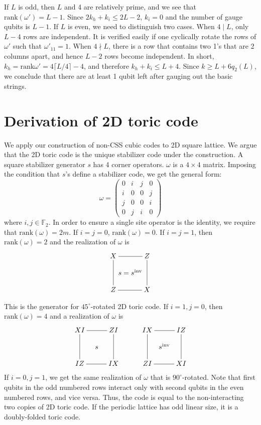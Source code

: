 \documentclass[letterpaper,10pt,pra,aps,showpacs,twocolumn]{revtex4-1}
\theoremstyle{definition} \newtheorem{defn}{Definition}
\theoremstyle{definition} \newtheorem{remark}{Remark}
\newcommand{\rank}{\mathrm{rank}}
\begin{document}
If $L$ is odd, then $L$ and 4 are relatively prime, and we see that $\rank(\omega') = L-1$. Since $2 k_h + k_i \leq 2L -2$, $k_i=0$ and the number of gauge qubits is $L-1$. If $L$ is even, we need to distinguish two cases. When $4 \mid L$, only $L-4$ rows are independent. It is verified easily if one cyclically rotate the rows of $\omega'$ such that $\omega'_{11}=1$. When $4 \nmid L$, there is a row that contains two 1's that are 2 columns apart, and hence $L-2$ rows become independent. In short, $k_h = \rank \omega' = 4 \lceil L/4 \rceil - 4$, and therefore $ k_h + k_i \leq L + 4$. Since $ k \geq L + 6 q_2(L) $, we conclude that there are at least 1 qubit left after gauging out the basic strings.


\section{Derivation of 2D toric code}

We apply our construction of non-CSS cubic codes to 2D square lattice. We argue that the 2D toric code is the unique stabilizer code under the construction. A square stabilizer generator $s$ has 4 corner operators. $\omega$ is a $4 \times 4$ matrix. Imposing the condition that $s$'s define a stabilizer code, we get the general form:
\begin{equation*}
 \omega = 
 \begin{pmatrix}
  0 & i & j & 0 \\
  i & 0 & 0 & j \\
  j & 0 & 0 & i \\
  0 & j & i & 0
 \end{pmatrix}
\end{equation*}
where $i,j \in \mathbb{F}_2$. In order to ensure a single site operator is the identity, we require that $\rank(\omega) = 2 m $. If $i=j=0$, $\rank(\omega)=0$. If $i=j=1$, then $\rank(\omega)=2$ and the realization of $\omega$ is
\[
 \xymatrix@!0{
  X\ar@{-}[rr]\ar@{-}[dd]&           & Z\ar@{-}[dd]\\
                         & s=s^\text{inv} &              \\
  Z \ar@{-}[rr]          &           & X           
 }
\]

This is the generator for $45^\circ$-rotated 2D toric code.
If $i=1,j=0$, then $\rank(\omega) = 4$ and a realization of $\omega$ is
\[
 \xymatrix@!0{
  XI\ar@{-}[rr]\ar@{-}[dd]&   & ZI\ar@{-}[dd]& & IX\ar@{-}[rr]\ar@{-}[dd]&   & IZ\ar@{-}[dd]\\
                          & s &              & &                         &s^\text{inv}& \\
  IZ \ar@{-}[rr]          &   & IX           & & ZI \ar@{-}[rr]          &   & XI
 }
\]
If $i=0,j=1$, we get the same realization of $\omega$ that is $90^\circ$-rotated. Note that first qubits in the odd numbered rows interact only with second qubits in the even numbered rows, and vice versa. Thus, the code is equal to the non-interacting two copies of 2D toric code. If the periodic lattice has odd linear size, it is a doubly-folded toric code.
\end{document}
